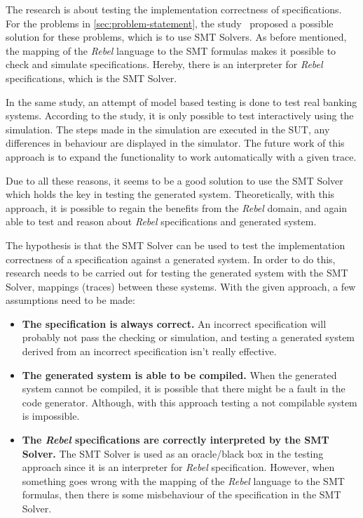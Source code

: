 The research is about testing the implementation correctness of specifications.
For the problems in \autoref{sec:problem-statement}, the
study~\cite[p.3]{stoelcase} proposed a possible solution for these problems,
which is to use SMT Solvers. As before mentioned, the mapping of the \textit{Rebel}
language to the SMT formulas makes it possible to check and simulate
specifications. Hereby, there is an interpreter for \textit{Rebel} specifications, which
is the SMT Solver.~\cite[p.5]{stoel_storm_vinju_bosman_2016}

In the same study,
an attempt of model based testing is done to test real banking systems.
According to the study, it is only possible to test interactively using the
simulation. The steps made in the simulation are executed in the SUT, any
differences in behaviour are displayed in the simulator. The future work of this
approach is to expand the functionality to work automatically with a given
trace.

Due to all these reasons, it seems to be a good solution to use the SMT
Solver which holds the key in testing the generated system. Theoretically, with
this approach, it is possible to regain the benefits from the \textit{Rebel} domain, and
again able to test and reason about \textit{Rebel} specifications and generated system.


The hypothesis is that the SMT Solver can be used to test the implementation
correctness of a specification against a generated system. In order to do this,
research needs to be carried out for testing the generated system
with the SMT Solver, mappings (traces) between these systems. With the given approach, a
few assumptions need to be made:
\begin{itemize}
\item \textbf{The specification is always correct.} An incorrect specification
will probably not pass the checking or simulation, and testing a generated
system derived from an incorrect specification isn't really effective.
\item \textbf{The generated system is able to be compiled.} When the generated
system cannot be compiled, it is possible that there might be a fault in the
code generator. Although, with this approach testing a not compilable system is
impossible.
\item \textbf{The \textit{Rebel} specifications are correctly interpreted by the SMT
Solver.} The SMT Solver is used as an oracle/black box in the testing approach
since it is an interpreter for \textit{Rebel} specification. However, when something goes
wrong with the mapping of the \textit{Rebel} language to the SMT formulas, then there is
some misbehaviour of the specification in the SMT Solver.
\end{itemize}


